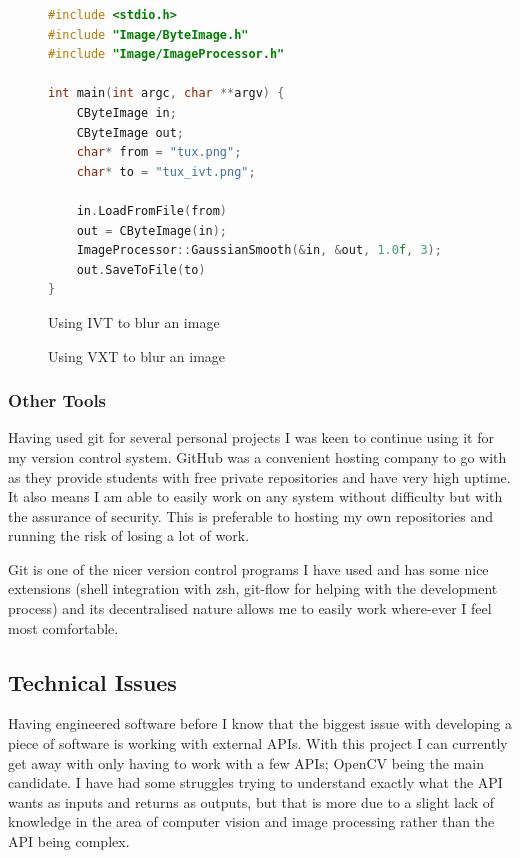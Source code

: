 \documentclass[11pt,fleqn,twoside]{article}
\begin{document}
\begin{figure}[p]
\begin{lstlisting}[language=C++]
#include <stdio.h>
#include "Image/ByteImage.h"
#include "Image/ImageProcessor.h"

int main(int argc, char **argv) {
	CByteImage in;
	CByteImage out;
	char* from = "tux.png";
	char* to = "tux_ivt.png";

	in.LoadFromFile(from)
	out = CByteImage(in);
	ImageProcessor::GaussianSmooth(&in, &out, 1.0f, 3);
	out.SaveToFile(to)
}
\end{lstlisting}
\caption{Using IVT to blur an image}
\label{fig:ivt}
\end{figure}

\begin{figure}[p]
\caption{Using VXT to blur an image}
\label{fig:vxt}
\end{figure}

\subsubsection{Other Tools}
Having used git for several personal projects I was keen to continue using it for my version 
control system. GitHub was a convenient hosting company to go with as they provide students with 
free private repositories and have very high uptime. It also means I am able to easily work on any 
system without difficulty but with the assurance of security. This is preferable to hosting my own
repositories and running the risk of losing a lot of work.

Git is one of the nicer version control programs I have used and has some nice extensions (shell
integration with zsh, git-flow for helping with the development process) and its decentralised 
nature allows me to easily work where-ever I feel most comfortable.

\subsection{Technical Issues}
Having engineered software before I know that the biggest issue with developing a piece of software
is working with external APIs. With this project I can currently get away with only having to work
with a few APIs; OpenCV being the main candidate. I have had some struggles trying to understand
exactly what the API wants as inputs and returns as outputs, but that is more due to a slight lack
of knowledge in the area of computer vision and image processing rather than the API being complex.
\end{document}
